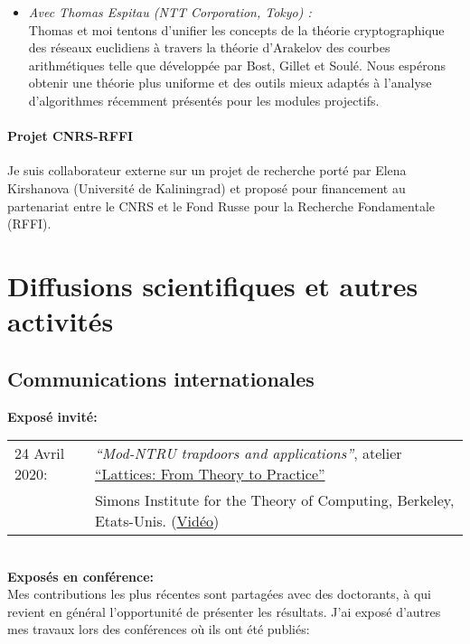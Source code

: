 \documentclass[11pt]{article}
\begin{document}
\begin{itemize}[label=$\bullet$]
    \item \emph{Avec Thomas Espitau (NTT Corporation, Tokyo) :}\\
    Thomas et moi tentons d'unifier les concepts de la théorie cryptographique des réseaux euclidiens à travers la théorie d'Arakelov des courbes arithmétiques telle que développée par Bost, Gillet et Soulé.
    Nous espérons obtenir une théorie plus uniforme et des outils mieux adaptés à l'analyse d'algorithmes récemment présentés pour les modules projectifs.


\end{itemize}

\paragraph{Projet CNRS-RFFI} Je suis collaborateur externe sur un projet de recherche porté par Elena Kirshanova (Université de Kaliningrad) et proposé pour financement au partenariat entre le CNRS et le Fond Russe pour la Recherche Fondamentale (RFFI).


\section{Diffusions scientifiques et autres activités}

\subsection*{Communications internationales}

\noindent \textbf{Exposé invité:}\\

\hspace{-0.85cm}\begin{tabular}{ll}
24 Avril 2020: & {\em ``Mod-NTRU trapdoors and applications''}, atelier \href{https://simons.berkeley.edu/workshops/lattices-2020-3}{``Lattices: From Theory to Practice''}\\ & Simons Institute for the Theory of Computing, Berkeley, Etats-Unis. (\href{https://www.youtube.com/watch?v=jWrdAFcvzpk}{Vidéo})
                \end{tabular}\\[5pt]

                
\noindent \textbf{Exposés en conférence:}\\[5pt]                
Mes contributions les plus récentes sont partagées avec des doctorants, à qui revient en général l'opportunité de présenter les résultats.
J'ai exposé d'autres mes travaux lors des conférences où ils ont été publiés:\\
\end{document}
